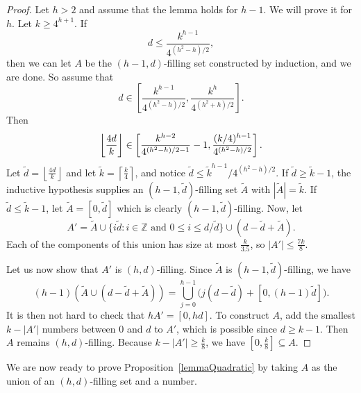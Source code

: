 \documentclass[10pt,a4paper]{article}
\theoremstyle{definition}
\theoremstyle{remark}
\numberwithin{equation}{section}
\numberwithin{theorem}{section}
\newcommand{\Z}{\mathbb{Z}}
\DeclarePairedDelimiter{\floor}{\lfloor}{\rfloor}
\begin{document}
\begin{proof}
    Let $h>2$ and assume that the lemma holds for $h-1$. We will prove it for $h$. Let $k \geq 4^{h+1}$. If \[d \leq \frac{k^{h-1}}{4^{(h^2-h)/2}},\] then we can let $A$ be the $(h-1,d)$-filling set constructed by induction, and we are done. So assume that \[d \in \left[\frac{k^{h-1}}{4^{(h^2-h)/2}},\frac{k^{h}}{4^{(h^2+h)/2}}\right].\]
    Then \[\floor*{\frac{4d}{k}} \in \left[\frac{k^{h-2}}{4^{(h^2-h)/2-1}}-1,\frac{(k/4)^{h-1}}{4^{(h^2-h)/2}}\right].\] 
    Let $\tilde{d} =\left\lfloor\frac{4d}{k}\right\rfloor$ and let $\tilde{k} = \left\lceil \frac{k}{4} \right\rceil$, and notice $\tilde{d} \leq \tilde{k}^{h-1}/4^{(h^2-h)/2}$. If $\tilde{d} \geq \tilde{k}-1$, the inductive hypothesis supplies an $(h-1,\tilde{d})$-filling set $\tilde{A}$ with $|\tilde{A}| = \tilde{k}$. If $\tilde{d} \leq \tilde{k}-1$, let $\tilde{A} = [0,\tilde{d}]$ which is clearly $(h-1,\tilde{d})$-filling. Now, let 
    \[A' = \tilde{A} \cup \{i\tilde{d}: i \in \Z \text{ and }0 \leq i \leq d/\tilde{d}\} \cup (d-\tilde{d}+\tilde{A}).\] 
    Each of the components of this union has size at most $\frac{k}{3.5}$, so $|A'| \leq \frac{7k}{8}$. 

    Let us now show that $A'$ is $(h,d)$-filling. Since $\tilde{A}$ is $(h-1,\tilde{d})$-filling, we have \[(h-1)\left(\tilde{A} \cup  (d-\tilde{d}+\tilde{A})\right) = \bigcup_{j=0}^{h-1} \Big(j(d-\tilde{d}) + [0,(h-1)\tilde{d}]\Big).\] It is then not hard to check that $hA' = [0,hd]$. To construct $A$, add the smallest $k-|A'|$ numbers between $0$ and $d$ to $A'$, which is possible since $d \geq k-1$. Then $A$ remains $(h,d)$-filling. Because $k-|A'| \geq \frac{k}{8}$, we have  $[0,\frac{k}{8}] \subseteq A$.
\end{proof}

We are now ready to prove Proposition~\ref{lemmaQuadratic} by taking $A$ as the union of an $(h,d)$-filling set and a number.
\end{document}

